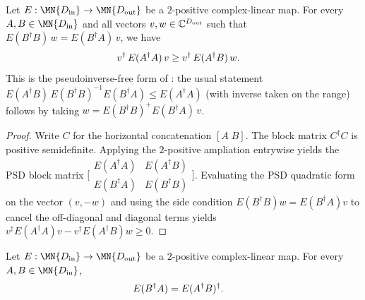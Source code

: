 \begin{lemma}
    \label{lem:two_variable_operator_schwarz_conditional}
    \leanok
    Let $E:\MN{D_{\rm in}}\to\MN{D_{\rm out}}$ be a $2$-positive
    complex-linear map. For every $A,B\in\MN{D_{\rm in}}$ and all vectors
    $v,w\in\mathbb C^{D_{\rm out}}$ such that
    $E(B^\dagger B)\,w = E(B^\dagger A)\,v$, we have
    \begin{align}
        v^\dagger\,E(A^\dagger A)\,v
         & \ge v^\dagger\,E(A^\dagger B)\,w.
        \notag
    \end{align}
    This is the pseudoinverse-free form of
    \cite[Eq.~(5.4)]{Wolf2012Quantum}: the usual statement
    $E(A^\dagger B)\,E(B^\dagger B)^{-1}E(B^\dagger A)\le E(A^\dagger A)$
    (with inverse taken on the range) follows by taking
    $w = E(B^\dagger B)^{+}E(B^\dagger A)\,v$.
\end{lemma}

\begin{proof}
    \leanok

    Write $C$ for the horizontal concatenation $[A\;B]$.
    The block matrix $C^\dagger C$ is positive semidefinite.
    Applying the $2$-positive ampliation entrywise yields the PSD block matrix
    $\bigl[\begin{smallmatrix}
        E(A^\dagger A) & E(A^\dagger B)\\
        E(B^\dagger A) & E(B^\dagger B)
    \end{smallmatrix}\bigr]$.
    Evaluating the PSD quadratic form on the vector $(v,-w)$ and using
    the side condition $E(B^\dagger B)w = E(B^\dagger A)v$ to cancel the
    off-diagonal and diagonal terms yields
    $v^\dagger E(A^\dagger A)v - v^\dagger E(A^\dagger B)w \ge 0$.
\end{proof}

\begin{theorem}
    \label{thm:map_EBA_eq_conjTranspose_EAB}
    \leanok
    Let $E:\MN{D_{\rm in}}\to\MN{D_{\rm out}}$ be a $2$-positive
    complex-linear map. For every $A,B\in\MN{D_{\rm in}}$,
    \begin{align}
        E(B^\dagger A) & = E(A^\dagger B)^\dagger.
        \notag
    \end{align}
\end{theorem}

